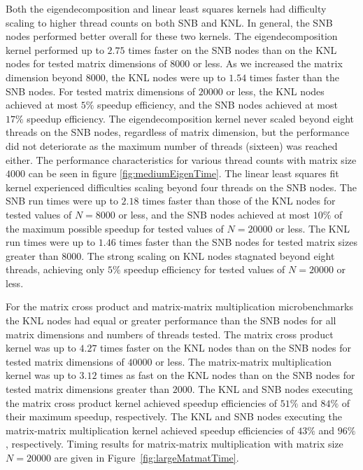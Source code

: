 Both the eigendecomposition and linear least squares kernels had difficulty scaling
to higher thread counts on both SNB and KNL. In general, the SNB nodes performed better
overall for these two kernels. The eigendecomposition kernel performed up to $2.75$ times
faster on the SNB nodes than on the KNL nodes for tested matrix dimensions of $8000$ or
less. As we increased the matrix dimension beyond $8000$, the KNL nodes were up to $1.54$
times faster than the SNB nodes. For tested matrix dimensions of $20000$ or less, the KNL
nodes achieved at most $5\%$ speedup efficiency, and the SNB nodes achieved
at most $17\%$ speedup efficiency. The eigendecomposition kernel never scaled
beyond eight threads on the SNB nodes, regardless of matrix dimension, but the performance
did not deteriorate as the maximum number of threads (sixteen) was reached either. The
performance characteristics for various thread counts with matrix size $4000$ can be seen
in figure \ref{fig:mediumEigenTime}. The linear least squares fit kernel experienced
difficulties scaling beyond four threads on the SNB nodes. The SNB run times were up to
$2.18$ times faster than those of the KNL nodes for tested values of $N=8000$ or less, and
the SNB nodes achieved at most $10\%$ of the maximum possible speedup for tested values of
$N=20000$ or less. The KNL run times were up to $1.46$ times faster than the SNB nodes for
tested matrix sizes greater than $8000$. The strong scaling on KNL nodes stagnated beyond
eight threads, achieving only $5\%$ speedup efficiency for tested values of
$N=20000$ or less.

For the matrix cross product and matrix-matrix multiplication microbenchmarks the KNL
nodes had equal or greater performance than the SNB nodes for all matrix dimensions and
numbers of threads tested. The matrix cross product kernel was up to $4.27$ times faster
on the KNL nodes than on the SNB nodes for tested matrix dimensions of $40000$ or less.
The matrix-matrix multiplication kernel was up to $3.12$ times as fast on the KNL nodes
than on the SNB nodes for tested matrix dimensions greater than $2000$. The KNL and SNB
nodes executing the matrix cross product kernel achieved speedup efficiencies of
$51\%$ and $84\%$ of their maximum speedup, respectively. The KNL and SNB nodes executing the matrix-matrix
multiplication kernel achieved speedup efficiencies of $43\%$ and $96\%$, respectively.
Timing results for matrix-matrix multiplication with matrix size $N=20000$
are given in Figure~\ref{fig:largeMatmatTime}.

